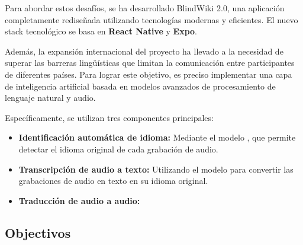 Para abordar estos desafíos, se ha desarrollado BlindWiki 2.0, una aplicación completamente rediseñada utilizando tecnologías modernas y eficientes. El nuevo stack tecnológico se basa en \textbf{React Native} y \textbf{Expo}.

Además, la expansión internacional del proyecto ha llevado a la necesidad de superar las barreras lingüísticas que limitan la comunicación entre participantes de diferentes países. Para lograr este objetivo, es preciso implementar una capa de inteligencia artificial basada en modelos avanzados de procesamiento de lenguaje natural y audio. 

Específicamente, se utilizan tres componentes principales:
\begin{itemize}
    \item \textbf{Identificación automática de idioma:} Mediante el modelo \TODO, que permite detectar el idioma original de cada grabación de audio.
    \item \textbf{Transcripción de audio a texto:} Utilizando el modelo \TODO para convertir las grabaciones de audio en texto en su idioma original.
    \item \textbf{Traducción de audio a audio:} \TODO
\end{itemize}

\subsection{Objectivos}